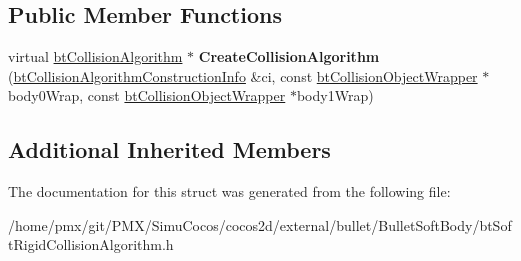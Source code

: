 \subsection*{Public Member Functions}
\begin{DoxyCompactItemize}
\item 
\mbox{\label{structbtSoftRigidCollisionAlgorithm_1_1CreateFunc_acab3c43a01b1fa470daa832a03d0afb4}} 
virtual \hyperlink{classbtCollisionAlgorithm}{bt\+Collision\+Algorithm} $\ast$ {\bfseries Create\+Collision\+Algorithm} (\hyperlink{structbtCollisionAlgorithmConstructionInfo}{bt\+Collision\+Algorithm\+Construction\+Info} \&ci, const \hyperlink{structbtCollisionObjectWrapper}{bt\+Collision\+Object\+Wrapper} $\ast$body0\+Wrap, const \hyperlink{structbtCollisionObjectWrapper}{bt\+Collision\+Object\+Wrapper} $\ast$body1\+Wrap)
\end{DoxyCompactItemize}
\subsection*{Additional Inherited Members}


The documentation for this struct was generated from the following file\+:\begin{DoxyCompactItemize}
\item 
/home/pmx/git/\+P\+M\+X/\+Simu\+Cocos/cocos2d/external/bullet/\+Bullet\+Soft\+Body/bt\+Soft\+Rigid\+Collision\+Algorithm.\+h\end{DoxyCompactItemize}
